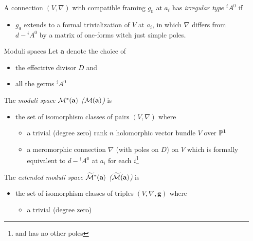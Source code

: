 \begin{frame}
  \begin{defn}[2.4]
    A connection $(V,\nabla)$ with compatible framing $g_0$ at $a_i$ has
    \emph{irregular type ${}^iA^0$} if
    \begin{itemize}
      \item $g_0$ extends to a formal trivialization of $V$ at $a_i$, in which
      $\nabla$ differs from $d-{}^iA^0$ by a matrix of one-forms witch just
      simple poles.
    \end{itemize}
  \end{defn}
\end{frame}

\begin{frame}{Moduli spaces}
  Let  $\textbf{a}$ denote the choice of
  \begin{itemize}
    \item the effectrive divisor $D$ and
    \item all the germs ${}^iA^0$
  \end{itemize}
  \begin{defn}[2.5]
    The \emph{moduli space $\cM^*(\textbf{a})$
    \textcolor{green!40!black}{($\cM(\textbf{a})$)}} is
    \begin{itemize}
      \item the set of isomorphism classes of pairs $(V,\nabla)$ where
        \begin{itemize}
          \item a trivial \textcolor{green!40!black}{(degree zero)} rank $n$
            holomorphic vector bundle $V$ over $\P^1$
          \item a meromorphic connection $\nabla$ (with poles on $D$) on $V$
            which is formally equivalent to $d-{}^iA^0$ at $a_i$ for each
            $i$\footnote{and has no other poles}
        \end{itemize}
    \end{itemize}
  \end{defn}
  \begin{defn}[2.6]
    The \emph{extended moduli space $\widetilde\cM^*(\textbf{a})$
    \textcolor{green!40!black}{($\widetilde\cM(\textbf{a})$)}} is
    \begin{itemize}
      \item the set of isomorphism classes of triples $(V,\nabla,\textbf{g})$
        where
        \begin{itemize}
          \item a trivial \textcolor{green!40!black}{(degree zero)}

\end{itemize}
\end{itemize}
\end{defn}
\end{frame}
